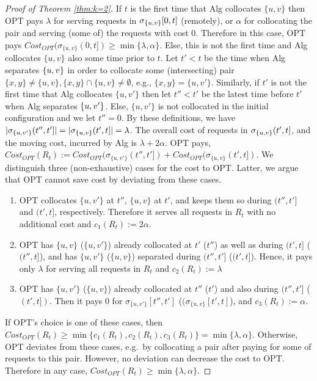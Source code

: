 \documentclass[manuscript,screen=true, review, anonymous]{acmart}
\DeclarePairedDelimiter\set{\{}{\}}
\begin{document}
\begin{proof}[Proof of Theorem \ref{thm:k=2}]
	If $t$ is the first time that Alg collocates $\{u,v\}$ then  OPT pays
	$\lambda$ for serving requests in $\sigma_{\set{u,v}}[0,t]$ (remotely),
	or $\alpha$ for collocating the pair and
	serving (some of) the requests with cost 0.
	Therefore in this case,
	OPT pays
	$\mathit{Cost}_{\mathit{OPT}} (\sigma_{\{u,v\}}(0,t]) \geq  \min{\{ \lambda,\alpha \}}$.
	Else, this is not the first time and
	Alg collocates $\{u,v\}$ also some time prior to $t$.
	Let $t' < t$ be the  time when Alg separates $\set{u,v}$
	in order to collocate some (intersecting) pair
	$\{x,y\} \neq \{u,v\}, \{x,y\} \cap \{u,v\} \neq \emptyset$, 
	e.g.,
	$\{x,y\}=\{u,v'\}$.
	Similarly,
	if $t'$ is not the first time that Alg  collocates $\{u,v'\}$ 
	then let $t''<t'$ be the latest time before $t'$ when Alg separates $\set{u,v'}$.
	Else,
	$\{u,v'\}$ is not collocated in the initial configuration and we let $t''=0$.
	By these definitions,
	we have
	$| \sigma_{\set{u,v'}}(t'',t'] | = | \sigma_{\set{u,v}}(t',t] |  =  \lambda$.
	The overall cost of requests in $\sigma_{\set{u,v}}(t',t]$,
	and the moving cost,
	incurred by Alg is
	$\lambda + 2\alpha$.
	OPT pays,
	$\mathit{Cost}_{\mathit{OPT}} (R_t) := \mathit{Cost}_{\mathit{OPT}} (\sigma_{\{u,v'\}}(t'',t']) 
	+ \mathit{Cost}_{\mathit{OPT}} (\sigma_{\{u,v\}}(t',t]) $.
	We distinguish three (non-exhaustive) cases for the cost to OPT.
	Latter,
	 we argue that OPT cannot save cost by deviating from these cases.
	\begin{enumerate}[label=\roman*.]
		\item
		OPT collocates $\{u,v'\}$ at  $t''$, $\{u,v\}$  at $t'$,
		and keeps them so during $(t'',t']$ and $(t',t]$, respectively.
		Therefore it serves all requests in $R_t$ with no additional cost and
		$ c_1 (R_t) := 2\alpha$.
		\item
		OPT has $\{u,v\}$ ($\{u,v'\}$) already collocated at $t'$ ($t''$) as well as during $(t',t]$ ($(t'',t]$),
		and has $\{u,v'\}$ ($\{u,v\}$) separated during $(t'',t']$ ($(t',t]$).
		Hence,
		it pays only $\lambda$ for serving all requests in $R_t$ and
		$c_2 (R_t) := \lambda$
		\item
		OPT has $\{u,v'\}$ ($\{u,v\}$) already collocated at $t''$ ($t'$)  and also during $(t'',t']$ ($(t', t])$.
		Then it pays 0 for $\sigma_{\{u,v'\}}[t'',t']$ ($(\sigma_{\{u,v\}}[t',t]$), and
		$c_3 (R_t) := \alpha$.
	\end{enumerate}
	If OPT's choice is one of these cases,
	then
	$\mathit{Cost}_{\mathit{OPT}} (R_t) \geq
		\min{\{ c_1(R_t), c_2(R_t), c_3(R_t) \}}  =
		\min{ \{ \lambda, \alpha \}}$.
	Otherwise,
	OPT deviates from these cases,
	e.g.~by collocating a pair after paying for some of requests to this pair.
	However,
	no deviation can decrease the cost to OPT.
	Therefore in any case,
	$\mathit{Cost}_{\mathit{OPT}} (R_t) \geq  \min{ \{ \lambda, \alpha \}}$.
	

\end{proof}
\end{document}
